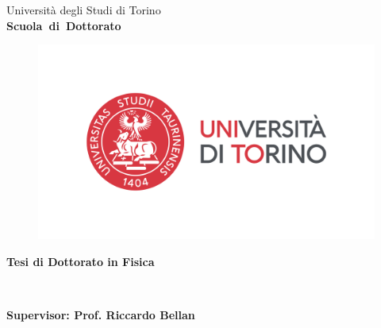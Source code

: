 \begin{titlepage}

\begin{center}
\begin{large}
Universit\`a degli Studi di Torino \\
{\bf Scuola~di~Dottorato}
\end{large}
\end{center}
\hrulefill

\vspace{-0.5cm}
\begin{figure}[h]
  \centering
  \includegraphics[width=.8\textwidth]{pictures/LogoUnito_Orizzontale_Colore_resize30percent.png}
\end{figure}

\vspace{-1cm}
\begin{center}
{\Large \bf Tesi di Dottorato in Fisica}
\end{center}

\vspace{2cm}
\begin{center}
  {\LARGE \bf \thetitle}\\
  \vspace{1cm}
         {\Large \bf \theauthor}
\end{center}

\vspace*{\fill}

{\large \bf Supervisor: Prof. Riccardo Bellan}

\vspace{1cm}
\end{titlepage}
